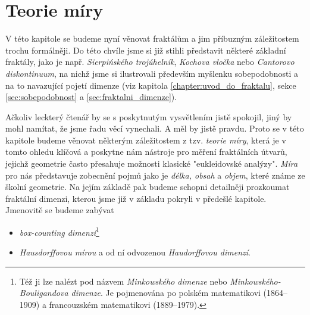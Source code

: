 \chapter{Teorie míry}\label{chapter:teorie-miry}

V této kapitole se budeme nyní věnovat fraktálům a jim příbuzným záležitostem trochu formálněji. Do této chvíle jsme si již stihli představit některé základní fraktály, jako je např. \emph{Sierpińského trojúhelník}, \emph{Kochova vločka} nebo \emph{Cantorovo diskontinuum}, na nichž jsme si ilustrovali především myšlenku sobepodobnosti a na to navazující pojetí dimenze (viz kapitola \ref{chapter:uvod_do_fraktalu}, sekce \ref{sec:sobepodobnost} a \ref{sec:fraktalni_dimenze}).

Ačkoliv leckterý čtenář by se s poskytnutým vysvětlením jistě spokojil, jiný by mohl namítat, že jsme řadu věcí vynechali. A měl by jistě pravdu. Proto se v této kapitole budeme věnovat některým záležitostem z tzv. \emph{teorie míry}, která je v tomto ohledu klíčová a poskytne nám nástroje pro měření fraktálních útvarů, jejichž geometrie často přesahuje možnosti klasické "eukleidovské analýzy". \emph{Míra} pro nás představuje zobecnění pojmů jako je \emph{délka, obsah} a \emph{objem}, které známe ze školní geometrie. Na jejím základě pak budeme schopni detailněji prozkoumat fraktální dimenzi, kterou jsme již v základu pokryli v předešlé kapitole. Jmenovitě se budeme zabývat
\begin{itemize}
    \item \emph{box-counting dimenzí}\footnote{Též ji lze nalézt pod názvem \emph{Minkowského dimenze} nebo \emph{Minkowského-Bouligandova dimenze}.  Je pojmenována po polském matematikovi  (1864--1909) a francouzském matematikovi  (1889--1979).} 
    \item \emph{Hausdorffovou mírou} a od ní odvozenou \emph{Haudorffovou dimenzí}.
\end{itemize}


